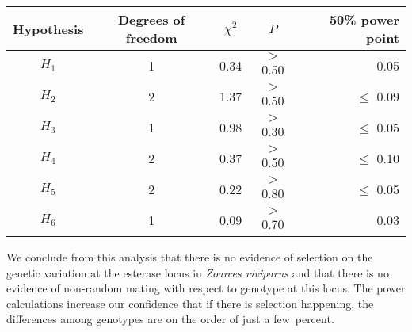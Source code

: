 \documentclass[12pt]{article}
\begin{document}
\begin{center}
\begin{tabular}{c|cc|c|r}
Hypothesis & Degrees of freedom & $\chi^2$ & $P$   & 50\% power point \\
\hline 
$H_1$      & 1                  & 0.34     & $>$0.50 & 0.05 \\
$H_2$      & 2                  & 1.37     & $>$0.50 & $\leq$ 0.09 \\
$H_3$      & 1                  & 0.98     & $>$0.30 & $\leq$ 0.05 \\
$H_4$      & 2                  & 0.37     & $>$0.50 & $\leq$ 0.10 \\
$H_5$      & 2                  & 0.22     & $>$0.80 & $\leq$ 0.05 \\
$H_6$      & 1                  & 0.09     & $>$0.70 & 0.03 \\
\end{tabular}
\end{center}

\medskip

We conclude from this analysis that there is no evidence of selection
on the genetic variation at the esterase locus in {\it Zoarces
viviparus\/} and that there is no evidence of non-random mating with
respect to genotype at this locus.  The power calculations increase
our confidence that if there is selection happening, the differences
among genotypes are on the order of just a few~percent.




\ccLicense
\end{document}
